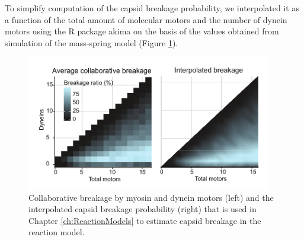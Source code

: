 To simplify computation of the capsid breakage probability, we interpolated it as a function of the total amount of molecular motors and the number of dynein motors using the R package akima on the basis of the values obtained from simulation of the mass-spring model (Figure \ref{figure:MassSpringInterpolation}).

\begin{figure}
\begin{center}
\includegraphics[width=0.95\textwidth, trim={0cm 0cm 0cm 0cm}, clip]{D_chapters/1_TugOfWar/SUPPLEMENTARYFIGURE1D.pdf}
\caption[Collaborative breakage by molecular motors and the interpolated capsid breakage probability]%
{Collaborative breakage by myosin and dynein motors (left) and the interpolated capsid breakage probability (right) that is used in Chapter \ref{ch:ReactionModels} to estimate capsid breakage in the reaction model.}
\label{figure:MassSpringInterpolation}
\end{center}
\end{figure}
